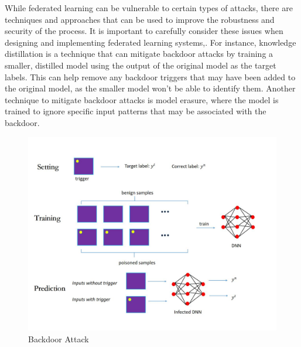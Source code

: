 \documentclass[conference]{IEEEtran}
\begin{document}
While federated learning can be vulnerable to certain types of attacks, there are techniques and approaches that can be used to improve the robustness and security of the process.
It is important to carefully consider these issues when designing and implementing federated learning systems\cite{b38},\cite{b39}.
For instance, knowledge distillation is a technique that can mitigate backdoor attacks by training a smaller\cite{b36},
distilled model using the output of the original model as the target labels.
This can help remove any backdoor triggers that may have been added to the original model, as the smaller model won't be able to identify them.
Another technique to mitigate backdoor attacks is model erasure\cite{b44}, where the model is trained to ignore specific input patterns that may be associated with the backdoor.
\begin{figure}[htbp]
    \centerline{\includegraphics[width=0.8\linewidth,height=0.4\linewidth]{picture/f3.jpg}}
    \caption{Backdoor Attack}
    \label{fig3}
\end{figure}
\end{document}
